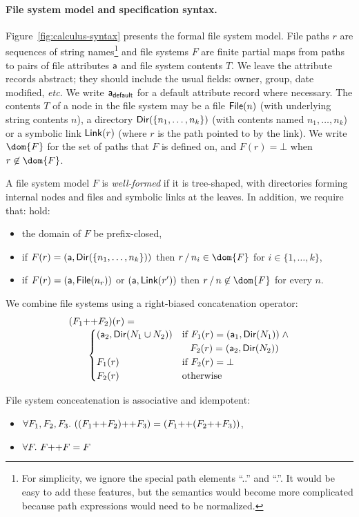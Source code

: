 \paragraph*{File system model and specification syntax.}
%
Figure~\ref{fig:calculus-syntax} presents the formal file system
model.  File paths $r$ are sequences of string names\footnote{For
  simplicity, we ignore the special path elements ``..'' and ``.''.
  It would be easy to add these features, but the semantics would
  become more complicated because path expressions would need to be
  normalized.}  and file systems $F$ are finite partial maps from
paths to pairs of file attributes $\mathsf{a}$ and file system contents $T$.
We leave the attribute records abstract; they should include the usual
fields: owner, group, date modified, {\it etc.}  We write
$\mathsf{a}_{\mathsf{default}}$ for a default attribute record where necessary.  The
contents $T$ of a node in the file system may be a file $\mathsf{File}(n)$
(with underlying string contents $n$), a directory $\mathsf{Dir}(
  \{ n_1,\dots,n_k \} )$ (with contents named $n_1, \ldots, n_k$) or a
symbolic link $\mathsf{Link}(r)$ (where $r$ is the path pointed to by the
link). We write $\dom{F}$ for the set of paths that $F$ is defined on,
and $F(r) = \bot$ when $r \not\in \dom{F}$.

A file system model $F$ is {\em well-formed} if it is tree-shaped,
with directories forming internal nodes and files and symbolic links
at the leaves. In addition, we require that:
hold:
%
\begin{itemize}
\item the domain of $F$ be prefix-closed,
\item if $F(r) = (\mathsf{a},\mathsf{Dir}( \{ n_1,\dots,n_k \} ))$ then
  $\PCons{r}{n_i} \in \dom{F}$ for $i \in \{1,\ldots,k\}$,
\item if $F(r) = (\mathsf{a},\mathsf{File}(n_r))$ or $(\mathsf{a},\mathsf{Link}(r'))$ then
  $\PCons{r}{n} \not\in \dom{F}$ for every $n$.
\end{itemize}
%

We combine file systems using a right-biased concatenation operator:
\[
\begin{array}{l}
(F_1 \text{++} F_2)(r) = \\
\qquad 
\begin{cases}
  (\mathsf{a}_2,\mathsf{Dir}(N_1 \cup N_2)) & \text{if}~F_1(r) = (\mathsf{a}_1,\mathsf{Dir}(N_1)) \; \wedge \\
                              & \;\;\; F_2(r) = (\mathsf{a}_2,\mathsf{Dir}(N_2))\\
  F_1(r) & \text{if}~F_2(r) = \bot\\
  F_2(r) & \text{otherwise}\\
\end{cases}
\end{array}
\]
%
\begin{prop} 
  File system conceatenation is associative and idempotent: 
  \begin{itemize}
  \item $\forall F_1,F_2,F_3.~((F_1 \text{++} F_2) \text{++} F_3) = (F_1 \text{++} (F_2 \text{++}
    F_3))$, 
  \item $\forall F.~F \text{++} F = F$
\end{itemize}
\end{prop}

